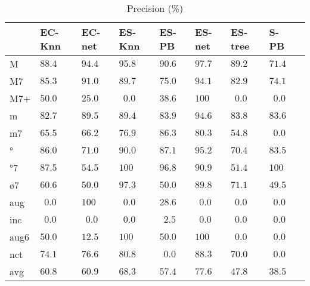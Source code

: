 \documentclass{article}
\begin{document}
\begin{table}
  \centering
\begin{tabular}{l|p{0.5cm}p{0.5cm}p{0.5cm}p{0.5cm}p{0.5cm}p{0.5cm}p{0.5cm}p{0.5cm}}
       &      EC-Knn &      EC-net &      ES-Knn &       ES-PB &      ES-net &     ES-tree &        S-PB \\ \hline
   M & $  88.4$ & $  94.4$ & $  95.8$ & $  90.6$ & $  97.7$ & $  89.2$ & $  71.4$ \\
  M7 & $  85.3$ & $  91.0$ & $  89.7$ & $  75.0$ & $  94.1$ & $  82.9$ & $  74.1$ \\
 M7+ & $  50.0$ & $  25.0$ & $ ~~0.0$ & $  38.6$ & $ 100$ & $ ~~0.0$ & $ ~~0.0$ \\
   m & $  82.7$ & $  89.5$ & $  89.4$ & $  83.9$ & $  94.6$ & $  83.8$ & $  83.6$ \\
  m7 & $  65.5$ & $  66.2$ & $  76.9$ & $  86.3$ & $  80.3$ & $  54.8$ & $ ~~0.0$ \\
  ° & $  86.0$ & $  71.0$ & $  90.0$ & $  87.1$ & $  95.2$ & $  70.4$ & $  83.5$ \\
 °7 & $  87.5$ & $  54.5$ & $ 100$ & $  96.8$ & $  90.9$ & $  51.4$ & $ 100$ \\
 ø7 & $  60.6$ & $  50.0$ & $  97.3$ & $  50.0$ & $  89.8$ & $  71.1$ & $  49.5$ \\
 aug & $ ~~0.0$ & $ 100$ & $ ~~0.0$ & $  28.6$ & $ ~~0.0$ & $ ~~0.0$ & $ ~~0.0$ \\
 inc & $ ~~0.0$ & $ ~~0.0$ & $ ~~0.0$ & $ ~~2.5$ & $ ~~0.0$ & $ ~~0.0$ & $ ~~0.0$ \\
aug6 & $  50.0$ & $  12.5$ & $ 100$ & $  50.0$ & $ 100$ & $ ~~0.0$ & $ ~~0.0$ \\
 nct & $  74.1$ & $  76.6$ & $  80.8$ & $ ~~0.0$ & $  88.3$ & $  70.0$ & $ ~~0.0$ \\
\hline avg & $  60.8$ & $  60.9$ & $  68.3$ & $  57.4$ & $  77.6$ & $  47.8$ & $  38.5$ \\
\end{tabular}


  \caption{Precision (\%)}
  \label{tab:precision}
\end{table}
\end{document}
